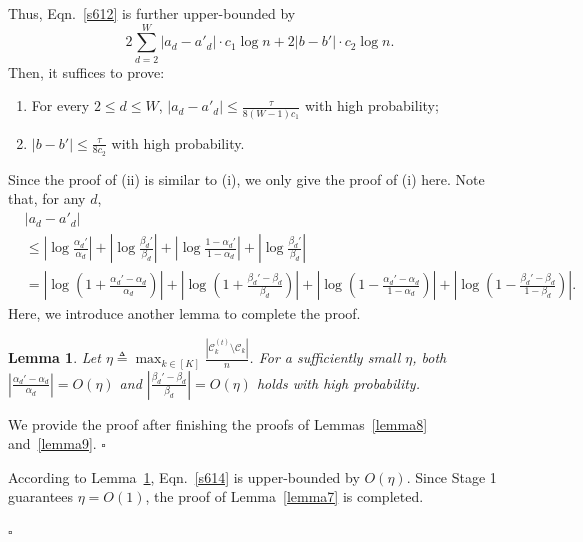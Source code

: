 \documentclass{article}
\newtheorem{lemma}{Lemma}
\newcommand\af{\alpha_d}
\newcommand\bt{\beta_d}
\newenvironment{proof}{{\noindent\it Proof:}\quad}{\hfill $\square$\par}
\begin{document}
	Thus, Eqn.~\eqref{s612} is further upper-bounded by 
 $$
 2 \sum_{d=2}^{W} | a_d - a'_d | \cdot c_1 \log n + 2 |b - b' | \cdot  c_2 \log n.
 $$
 Then, it suffices to prove: 
 \begin{enumerate}[label=(\roman*)]
     \item For every $2 \le d \le W$, $| a_d - a'_d | \leq \frac{\tau}{8 (W-1) c_1}$ with high probability;
     \item $|b-b'| \leq \frac{\tau}{8c_2}$ with high probability.
 \end{enumerate}
  Since the proof of (ii) is similar to (i), we only give the proof of (i) here. Note that, for any $d$,
\begin{equation}\label{s614}
        \begin{aligned}
        &| a_d - a'_d | \\
        & \leq \left|\log \frac{\alpha_d'}{\af } \right| + \left|\log \frac{\beta_d'}{\bt } \right| + \left|\log \frac{1-\alpha_d'}{1-\af } \right| + \left|\log \frac{\beta_d'}{\bt } \right| \\
        & = \left| \log \left( 1+\frac{\alpha_d'-\af }{\af } \right) \right| + \left| \log \left( 1+\frac{\beta_d'-\bt }{\bt } \right) \right| + \left| \log \left( 1-\frac{\alpha_d' - \af  }{1-\af } \right) \right| + \left| \log \left( 1-\frac{\beta_d' - \bt }{1-\bt } \right) \right|.
    \end{aligned}
\end{equation}
Here, we introduce another lemma to complete the proof.
\begin{lemma}\label{lemma10}
		Let $\eta \triangleq \max_{k \in [K]} \frac{|\mathcal{C}^{(t)}_k \setminus \mathcal{C}_k|}{n}$. For a sufficiently small $\eta$, both $\left| \frac{\alpha_d'-\af }{\af } \right| = O(\eta)$ and $\left| \frac{\beta_d'-\bt }{\bt  } \right| = O(\eta)$ holds with high probability.
	\end{lemma}
        \begin{proof}
            We provide the proof after finishing the proofs of Lemmas~\ref{lemma8} and~\ref{lemma9}.
        \end{proof}
	According to Lemma~\ref{lemma10}, Eqn.~\eqref{s614} is upper-bounded by $O(\eta)$. Since Stage 1 guarantees $\eta = O(1)$, the proof of Lemma~\ref{lemma7} is completed.

\hfill $\square$\par
\end{document}
